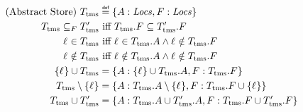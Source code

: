 \documentclass[a4paper,12pt]{article}
\begin{document}
\begin{definition}{}
  \begin{gather*}
    \begin{aligned}
      \text{(Abstract Store)}~\tmsMonitor &\isdef\{A : \mi{Locs}, F : \mi{Locs}\} \\
      \tmsMonitor\subseteq_F \tmsMonitor['] &\text{ iff } \tmsMonitor[.F] \subseteq \tmsMonitor['.F]\\
      \varLoc\in \tmsMonitor &\text{ iff } \varLoc \in {\tmsMonitor[.A]} \wedge \varLoc \notin {\tmsMonitor[.F]}\\
      \varLoc\notin \tmsMonitor &\text{ iff } \varLoc \notin {\tmsMonitor[.A]} \wedge \varLoc \notin {\tmsMonitor[.F]}\\
      \{\varLoc\}\cup \tmsMonitor &= \{A : \{\varLoc\}\cup \tmsMonitor[.A], F : \tmsMonitor[.F]\}\\
      \tmsMonitor\setminus\{\varLoc\} &= \{A : \tmsMonitor[.A]\setminus\{\varLoc\}, F : \tmsMonitor[.F]\cup\left\{\varLoc\right\}\}\\
      \tmsMonitor\cup \tmsMonitor' &= \{A : \tmsMonitor[.A]\cup \tmsMonitor['.A], F : \tmsMonitor[.F]\cup \tmsMonitor['.F]\}\\
    \end{aligned}
  \end{gather*}
\end{definition}
\end{document}
